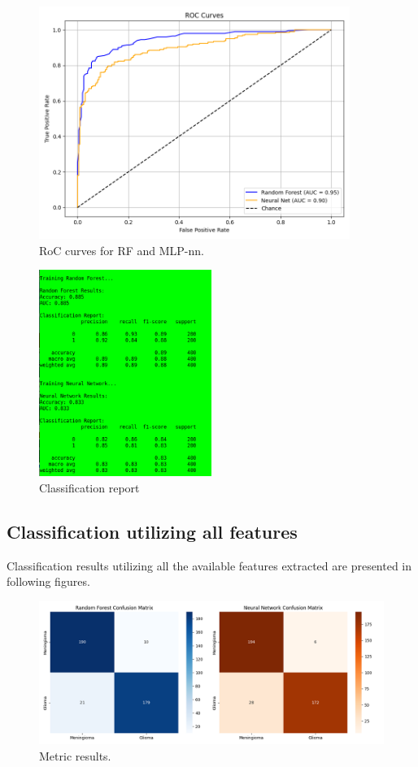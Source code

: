 \documentclass[11pt,a4paper]{article}
\begin{document}
		\begin{figure}[H]
			\centering
			\includegraphics[width=0.9\textwidth]{images/freq_roc.png}
			\caption{RoC curves for RF and MLP-nn.}
			\label{fig1:}
		\end{figure}		

		\begin{figure}[H]
			\centering
			\includegraphics[width=0.5\textwidth]{images/report_freq.png}
			\caption{Classification report}
			\label{fig1:}
		\end{figure}		


	\subsection{Classification utilizing all features}

		Classification results utilizing all the available features extracted are presented in following figures.
		\begin{figure}[H]
			\centering
			\includegraphics[width=1.1\textwidth]{images/Metrics_all_features.png}
			\caption{Metric results.}
			\label{fig1:}
		\end{figure}		
\end{document}
